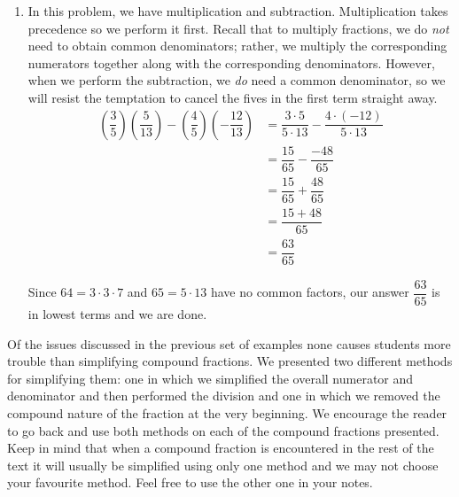 {\begin{enumerate}
This means that we should simplify the numerator and denominator first, then perform the division last.  We tend to what's in parentheses first, giving multiplication priority over addition and subtraction.
\begin{align*}
\dfrac{(2(2)+1)(-3-(-3)) - 5(4-7)}{4-2(3)} & =  \dfrac{(4+1)(-3+3)-5(-3)}{4 - 6}   \\
	& =  \dfrac{(5)(0) + 15}{-2}  =  \dfrac{15}{-2}  \\[5pt] 
	& =  -\dfrac{15}{2}  \tag*{Properties of Negatives}
\end{align*}
Since $15 = 3\cdot 5$ and $2$ have no common factors, we are done.
																			



\item  In this problem, we have multiplication and subtraction.  Multiplication takes precedence so we perform it first.  Recall that to multiply fractions, we do \textit{not} need to obtain common denominators;  rather, we multiply the corresponding numerators together along with the corresponding denominators.  However, when we perform the subtraction, we \textit{do} need a common denominator, so we will resist the temptation to cancel the fives in the first term straight away.
\begin{align*}
\left(\dfrac{3}{5} \right) \left(\dfrac{5}{13} \right) - \left(\dfrac{4}{5}\right) \left( - \dfrac{12}{13}\right) & =  \dfrac{3 \cdot 5}{5 \cdot 13} - \dfrac{4\cdot (-12)}{5 \cdot 13}  \tag*{Multiply fractions}\\[5pt] 
& =  \dfrac{15}{65} - \dfrac{-48}{65}  \\[5pt]
& =  \dfrac{15}{65} + \dfrac{48}{65}  \tag*{Properties of Negatives}\\[5pt]
& =  \dfrac{15+48}{65}   \tag*{Add numerators} \\[5pt] 
& =  \dfrac{63}{65} 
\end{align*}

Since $64 = 3 \cdot 3 \cdot 7$ and $65 = 5 \cdot 13$ have no common factors, our answer $\dfrac{63}{65}$ is in lowest terms and we are done. 
\end{enumerate}
} 

\medskip

Of the issues discussed in the previous set of examples none causes students more trouble than simplifying compound fractions.  We presented two different methods for simplifying them:  one in which we simplified the overall numerator and denominator and then performed the division and one in which we removed the compound nature of the fraction at the very beginning.   We encourage the reader to go back and use both methods on each of the compound fractions presented.  Keep in mind that when a compound fraction is encountered in the rest of the text it will usually be simplified using only one method and we may not choose your favourite method.  Feel free to use the other one in your notes.




